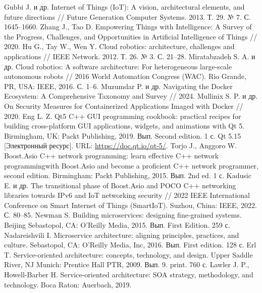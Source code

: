 \documentclass[a4paper, 14pt]{extreport}
\begin{document}
\begin{thebibliography}{9}
            Gubbi J. и др. Internet of Things (IoT): A vision, architectural elements, and future directions // Future Generation Computer Systems. 2013. Т. 29. № 7. С. 1645–1660.
          Zhang J., Tao D. Empowering Things with Intelligence: A Survey of the Progress, Challenges, and Opportunities in Artificial Intelligence of Things // 2020.
         Hu G., Tay W., Wen Y. Cloud robotics: architecture, challenges and applications // IEEE Network. 2012. Т. 26. № 3. С. 21–28.
         Miratabzadeh S. A. и др. Cloud robotics: A software architecture: For heterogeneous large-scale autonomous robots // 2016 World Automation Congress (WAC). Rio Grande, PR, USA: IEEE, 2016. С. 1–6.
          Muzumdar P. и др. Navigating the Docker Ecosystem: A Comprehensive Taxonomy and Survey // 2024.
          Mullinix S. P. и др. On Security Measures for Containerized Applications Imaged with Docker // 2020.
               Eng L. Z. Qt5 C++ GUI programming cookbook: practical recipes for building cross-platform GUI applications, widgets, and animations with Qt 5. Birmingham, UK: Packt Publishing, 2019. Вып. Second edition. 1 с.
                Qt 5.15 [Электронный ресурс]. URL: \url{https://doc.qt.io/qt-5/}.
              Torjo J., Anggoro W. Boost.Asio C++ network programming: learn effective C++ network programmingwith Boost.Asio and become a proficient C++ network programmer, second edition. Birmingham: Packt Publishing, 2015. Вып. 2nd ed. 1 с.
               Kadusic E. и др. The transitional phase of Boost.Asio and POCO C++ networking libraries towards IPv6 and IoT networking security // 2022 IEEE International Conference on Smart Internet of Things (SmartIoT). Suzhou, China: IEEE, 2022. С. 80–85.       
          Newman S. Building microservices: designing fine-grained systems. Beijing Sebastopol, CA: O’Reilly Media, 2015. Вып. First Edition. 259 с.
         Nadareishvili I. Microservice architecture: aligning principles, practices, and culture. Sebastopol, CA: O’Reilly Media, Inc, 2016. Вып. First edition. 128 с.
             Erl T. Service-oriented architecture: concepts, technology, and design. Upper Saddle River, NJ Munich: Prentice Hall PTR, 2009. Вып. 9. print. 760 с.
             Lawler J. P., Howell-Barber H. Service-oriented architecture: SOA strategy, methodology, and technology. Boca Raton: Auerbach, 2019.

\end{thebibliography}
\end{document}
